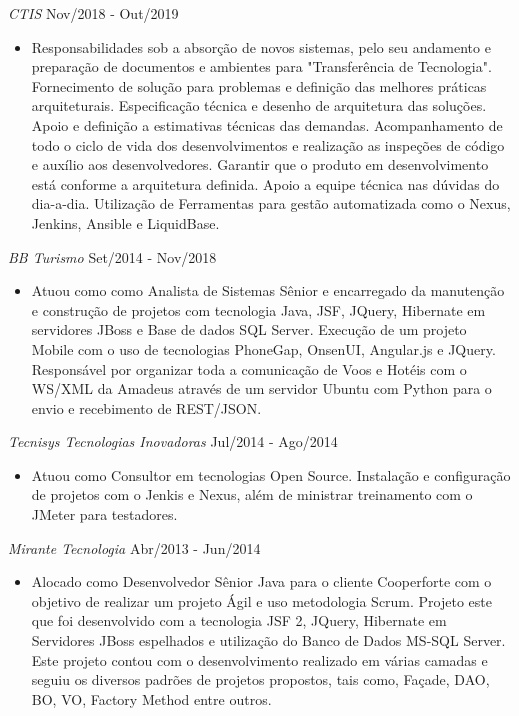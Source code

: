 \documentclass{res}
\begin{document}
\begin{resume}
		{\sl CTIS} \hfill Nov/2018 - Out/2019
		\begin{itemize}
			\item Responsabilidades sob a absorção de novos sistemas, pelo seu andamento e preparação de documentos e ambientes para "Transferência de Tecnologia". Fornecimento de solução para problemas e definição das melhores práticas arquiteturais. Especificação técnica e desenho de arquitetura das soluções. Apoio e definição a estimativas técnicas das demandas. Acompanhamento de todo o ciclo de vida dos desenvolvimentos e realização as inspeções de código e auxílio aos desenvolvedores. Garantir que o produto em desenvolvimento está conforme a arquitetura definida. Apoio a equipe técnica nas dúvidas do dia-a-dia. Utilização de Ferramentas para gestão automatizada como o Nexus, Jenkins, Ansible e LiquidBase.
		\end{itemize}
		
		{\sl BB Turismo} \hfill Set/2014 - Nov/2018
		\begin{itemize}
			\item Atuou como como Analista de Sistemas Sênior e encarregado da manutenção e construção de projetos com tecnologia Java, JSF, JQuery, Hibernate em servidores JBoss e Base de dados SQL Server. Execução de um projeto Mobile com o uso de tecnologias PhoneGap, OnsenUI, Angular.js e JQuery. Responsável por organizar toda a comunicação de Voos e Hotéis com o WS/XML da Amadeus através de um servidor Ubuntu com Python para o envio e recebimento de REST/JSON.
		\end{itemize}
		
		{\sl Tecnisys Tecnologias Inovadoras} \hfill Jul/2014 - Ago/2014
		\begin{itemize}
			\item Atuou como Consultor em tecnologias Open Source. Instalação e configuração de projetos com o Jenkis e Nexus, além de ministrar treinamento com o JMeter para testadores.
		\end{itemize}
		
		{\sl Mirante Tecnologia} \hfill Abr/2013 - Jun/2014
		\begin{itemize}
			\item Alocado como Desenvolvedor Sênior Java para o cliente Cooperforte com o objetivo de realizar um projeto Ágil e uso metodologia Scrum. Projeto este que foi desenvolvido com a tecnologia JSF 2, JQuery, Hibernate em Servidores JBoss espelhados e utilização do Banco de Dados MS-SQL Server. Este projeto contou com o desenvolvimento realizado em várias camadas e seguiu os diversos padrões de projetos propostos, tais como, Façade, DAO, BO, VO, Factory Method entre outros. 
		\end{itemize}
		

\end{resume}
\end{document}
